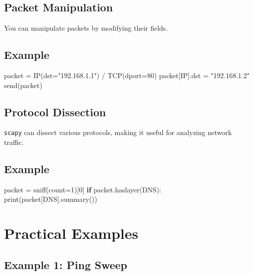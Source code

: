 \documentclass[
  letterpaper,
  DIV=11,
  numbers=noendperiod]{scrreprt}
\newenvironment{Shaded}{\begin{snugshade}}{\end{snugshade}}
\newcommand{\BuiltInTok}[1]{\textcolor[rgb]{0.00,0.23,0.31}{#1}}
\newcommand{\ControlFlowTok}[1]{\textcolor[rgb]{0.00,0.23,0.31}{\textbf{#1}}}
\newcommand{\DecValTok}[1]{\textcolor[rgb]{0.68,0.00,0.00}{#1}}
\newcommand{\NormalTok}[1]{\textcolor[rgb]{0.00,0.23,0.31}{#1}}
\newcommand{\OperatorTok}[1]{\textcolor[rgb]{0.37,0.37,0.37}{#1}}
\newcommand{\StringTok}[1]{\textcolor[rgb]{0.13,0.47,0.30}{#1}}
\begin{document}
\subsection{Packet Manipulation}\label{packet-manipulation}

You can manipulate packets by modifying their fields.

\subsection{Example}\label{example-27}

\begin{Shaded}
\begin{Highlighting}[]
\NormalTok{packet }\OperatorTok{=}\NormalTok{ IP(dst}\OperatorTok{=}\StringTok{"192.168.1.1"}\NormalTok{) }\OperatorTok{/}\NormalTok{ TCP(dport}\OperatorTok{=}\DecValTok{80}\NormalTok{)}
\NormalTok{packet[IP].dst }\OperatorTok{=} \StringTok{"192.168.1.2"}
\NormalTok{send(packet)}
\end{Highlighting}
\end{Shaded}

\subsection{Protocol Dissection}\label{protocol-dissection}

\texttt{scapy} can dissect various protocols, making it useful for
analyzing network traffic.

\subsection{Example}\label{example-28}

\begin{Shaded}
\begin{Highlighting}[]
\NormalTok{packet }\OperatorTok{=}\NormalTok{ sniff(count}\OperatorTok{=}\DecValTok{1}\NormalTok{)[}\DecValTok{0}\NormalTok{]}
\ControlFlowTok{if}\NormalTok{ packet.haslayer(DNS):}
    \BuiltInTok{print}\NormalTok{(packet[DNS].summary())}
\end{Highlighting}
\end{Shaded}

\section{Practical Examples}\label{practical-examples-5}

\subsection{Example 1: Ping Sweep}\label{example-1-ping-sweep}
\end{document}
